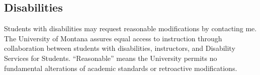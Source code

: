 \documentclass[12pt,letterpaper]{scrartcl}
\begin{document}
\subsection*{Disabilities}
Students with disabilities may request reasonable modifications by contacting
me. The University of Montana assures equal access to instruction through
collaboration between students with disabilities, instructors, and Disability
Services for Students. “Reasonable” means the University permits no fundamental
alterations of academic standards or retroactive modifications. 
\end{document}
